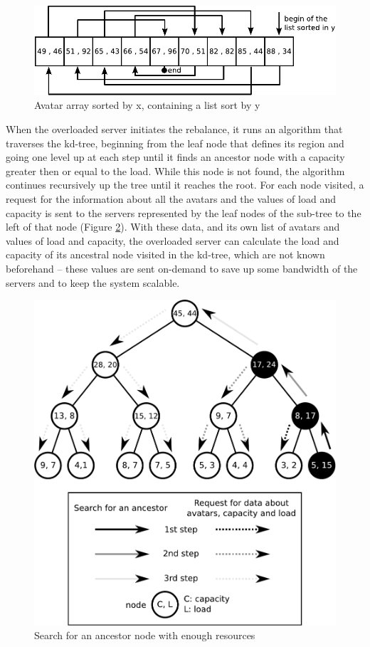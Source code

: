 \begin{figure}
  \centering
  \includegraphics[width=0.9\linewidth]{images/vectorxlisty}
  \caption{Avatar array sorted by x, containing a list sort by y}
   \label{fig:vectorxlisty}
\end{figure}

When the overloaded server initiates the rebalance, it runs an algorithm that traverses the kd-tree, beginning from the leaf node that defines its region and going one level up at each step until it finds an ancestor node with a capacity greater then or equal to the load. While this node is not found, the algorithm continues recursively up the tree until it reaches the root. For each node visited, a request for the information about all the avatars and the values of load and capacity is sent to the servers represented by the leaf nodes of the sub-tree to the left of that node (Figure \ref{fig:ancestors}). With these data, and its own list of avatars and values of load and capacity, the overloaded server can calculate the load and capacity of its ancestral node visited in the kd-tree, which are not known beforehand -- these values are sent on-demand to save up some bandwidth of the servers and to keep the system scalable.

\begin{figure}
  \centering
  \includegraphics[width=0.9\linewidth]{images/ancestors}
  \caption{Search for an ancestor node with enough resources}
   \label{fig:ancestors}
\end{figure}

